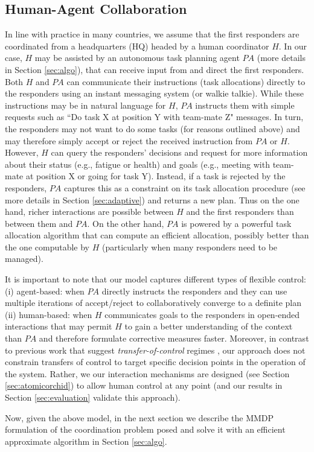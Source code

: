 \subsection{Human-Agent Collaboration}
\noindent In line with practice in many countries, we assume that the first responders are coordinated from a headquarters (HQ) headed by a human coordinator $H$. In our case, $H$ may be assisted by an autonomous task planning agent $PA$ (more details in Section \ref{sec:algo}), that can receive input from and direct the first responders.   Both  $H$ and $PA$  can communicate their  instructions (task allocations) directly to the responders using an instant messaging system (or walkie talkie).  While these instructions may be in natural language for $H$, $PA$ instructs them with simple requests such as ``Do task X at position Y with team-mate Z" messages. In turn, the responders may not want to do some tasks (for reasons outlined above) and may therefore simply accept or reject the received instruction from $PA$ or $H$. However, $H$ can query the responders' decisions and request for more information about their status (e.g., fatigue or health) and goals (e.g., meeting with team-mate at position X or going for task Y). Instead, if a task is rejected by the responders, $PA$ captures this as a constraint on its task allocation procedure (see more details in Section \ref{sec:adaptive}) and returns a new plan. Thus on the one hand, richer interactions are possible between $H$ and the first responders than between them and $PA$. On the other hand, $PA$ is powered by a powerful task allocation algorithm that can compute an efficient allocation, possibly better than the one computable by $H$ (particularly when many responders need to be managed). 

It is important to note that our model captures different types of flexible control: (i) agent-based: when $PA$ directly instructs the responders  and they can use multiple iterations of accept/reject to collaboratively converge to a definite  plan (ii) human-based: when $H$ communicates goals to the responders in open-ended interactions that may permit $H$ to gain a better understanding of the context than $PA$ and therefore formulate corrective measures faster. Moreover, in contrast to previous work that suggest \emph{transfer-of-control} regimes \cite{scerri:etal:2005}, our approach does not constrain transfers of control to target specific decision points in the operation of the system. Rather, we our interaction mechanisms are designed (see Section \ref{sec:atomicorchid}) to allow human control at any point (and our results  in Section \ref{sec:evaluation} validate this approach). 

Now, given the above model,  in the next section we describe the MMDP formulation of the coordination problem posed and solve it with an efficient approximate algorithm in Section \ref{sec:algo}.



